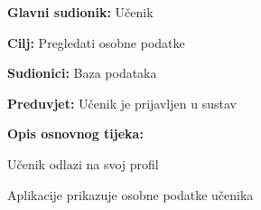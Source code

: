 					\noindent {}
					\begin{packed_item}
	
						\item \textbf{Glavni sudionik: }Učenik
						\item  \textbf{Cilj:} Pregledati osobne podatke
						\item  \textbf{Sudionici:} Baza podataka
						\item  \textbf{Preduvjet:} Učenik je prijavljen u sustav
						\item  \textbf{Opis osnovnog tijeka:}
						
						\item[] \begin{packed_enum}
	
							\item Učenik odlazi na svoj profil
							\item Aplikacije prikazuje osobne podatke učenika
						\end{packed_enum}
						
					\end{packed_item}

